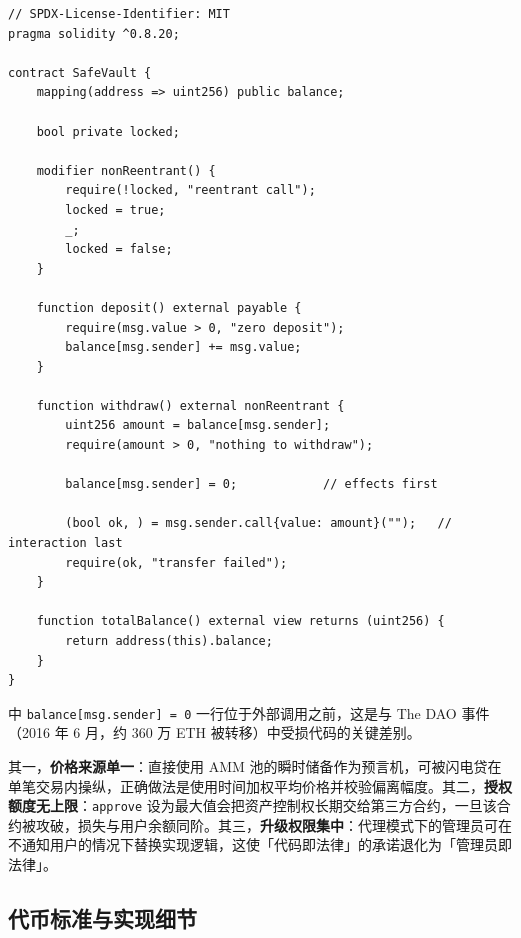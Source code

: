 \begin{lstlisting}[style=soliditystyle,
                   caption={防重入的提款合约（检查--生效--交互 + 互斥锁）},
                   label={lst:03-vault}]
// SPDX-License-Identifier: MIT
pragma solidity ^0.8.20;

contract SafeVault {
    mapping(address => uint256) public balance;

    bool private locked;

    modifier nonReentrant() {
        require(!locked, "reentrant call");
        locked = true;
        _;
        locked = false;
    }

    function deposit() external payable {
        require(msg.value > 0, "zero deposit");
        balance[msg.sender] += msg.value;
    }

    function withdraw() external nonReentrant {
        uint256 amount = balance[msg.sender];
        require(amount > 0, "nothing to withdraw");

        balance[msg.sender] = 0;            // effects first

        (bool ok, ) = msg.sender.call{value: amount}("");   // interaction last
        require(ok, "transfer failed");
    }

    function totalBalance() external view returns (uint256) {
        return address(this).balance;
    }
}
\end{lstlisting}

中 \texttt{balance[msg.sender] = 0} 一行位于外部调用之前，这是与 The DAO 事件（2016 年 6 月，约 360 万 ETH 被转移）中受损代码的关键差别。

\begin{warningbox}[代码清单之外的三类常见错误]
其一，\textbf{价格来源单一}：直接使用 AMM 池的瞬时储备作为预言机，可被闪电贷在单笔交易内操纵，正确做法是使用时间加权平均价格并校验偏离幅度。其二，\textbf{授权额度无上限}：\texttt{approve} 设为最大值会把资产控制权长期交给第三方合约，一旦该合约被攻破，损失与用户余额同阶。其三，\textbf{升级权限集中}：代理模式下的管理员可在不通知用户的情况下替换实现逻辑，这使「代码即法律」的承诺退化为「管理员即法律」。
\end{warningbox}

\subsection{代币标准与实现细节}

